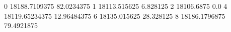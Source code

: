 0 18188.7109375 82.0234375
1 18113.515625 6.828125
2 18106.6875 0.0
4 18119.65234375 12.96484375
6 18135.015625 28.328125
8 18186.1796875 79.4921875
